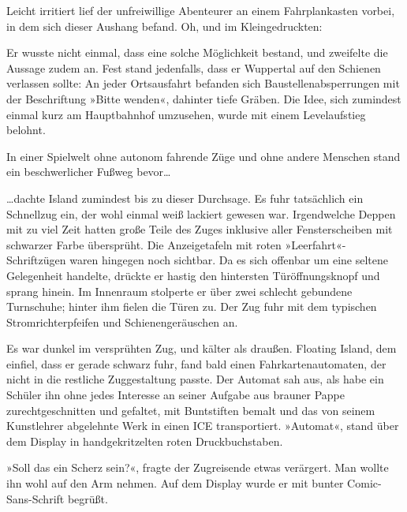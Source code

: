 
Leicht irritiert lief der unfreiwillige Abenteurer an einem Fahrplankasten vorbei, in dem sich dieser Aushang befand. Oh, und im Kleingedruckten:


Er wusste nicht einmal, dass eine solche Möglichkeit bestand, und zweifelte die Aussage zudem an. Fest stand jedenfalls, dass er Wuppertal auf den Schienen verlassen sollte: An jeder Ortsausfahrt befanden sich Baustellenabsperrungen mit der Beschriftung »Bitte wenden«, dahinter tiefe Gräben. Die Idee, sich zumindest einmal kurz am Hauptbahnhof umzusehen, wurde mit einem Levelaufstieg belohnt.

In einer Spielwelt ohne autonom fahrende Züge und ohne andere Menschen stand ein beschwerlicher Fußweg bevor…


…dachte Island zumindest bis zu dieser Durchsage. Es fuhr tatsächlich ein Schnellzug ein, der wohl einmal weiß lackiert gewesen war. Irgendwelche Deppen mit zu viel Zeit hatten große Teile des Zuges inklusive aller Fensterscheiben mit schwarzer Farbe übersprüht. Die Anzeigetafeln mit roten »Leerfahrt«-Schriftzügen waren hingegen noch sichtbar. Da es sich offenbar um eine seltene Gelegenheit handelte, drückte er hastig den hintersten Türöffnungsknopf und sprang hinein. Im Innenraum stolperte er über zwei schlecht gebundene Turnschuhe; hinter ihm fielen die Türen zu. Der Zug fuhr mit dem typischen Stromrichterpfeifen und Schienengeräuschen an.

Es war dunkel im versprühten Zug, und kälter als draußen. Floating Island, dem einfiel, dass er gerade schwarz fuhr, fand bald einen Fahrkartenautomaten, der nicht in die restliche Zuggestaltung passte. Der Automat sah aus, als habe ein Schüler ihn ohne jedes Interesse an seiner Aufgabe aus brauner Pappe zurechtgeschnitten und gefaltet, mit Buntstiften bemalt und das von seinem Kunstlehrer abgelehnte Werk in einen ICE transportiert. »Automat«, stand über dem Display in handgekritzelten roten Druckbuchstaben.

»Soll das ein Scherz sein?«, fragte der Zugreisende etwas verärgert. Man wollte ihn wohl auf den Arm nehmen. Auf dem Display wurde er mit bunter Comic-Sans-Schrift begrüßt.

